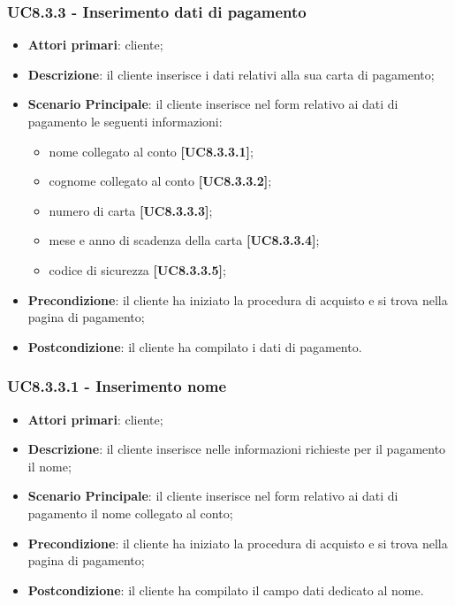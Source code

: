 \subsubsection{UC8.3.3 - Inserimento dati di pagamento}
\begin{itemize}
\item \textbf{Attori primari}: cliente;
\item \textbf{Descrizione}: il cliente inserisce i dati relativi alla sua carta di pagamento;
\item \textbf{Scenario Principale}: il cliente inserisce nel form relativo ai dati di pagamento le seguenti informazioni:
\begin{itemize}
	\item nome collegato al conto \textbf{[UC8.3.3.1]};
	\item cognome collegato al conto \textbf{[UC8.3.3.2]};
	\item numero di carta \textbf{[UC8.3.3.3]};
	\item mese e anno di scadenza della carta \textbf{[UC8.3.3.4]};
	\item codice di sicurezza \textbf{[UC8.3.3.5]};
\end{itemize}
\item \textbf{Precondizione}: il cliente ha iniziato la procedura di acquisto e si trova nella pagina di pagamento;
\item \textbf{Postcondizione}: il cliente ha compilato i dati di pagamento.
\end{itemize}

\subsubsection{UC8.3.3.1 - Inserimento nome}
\begin{itemize}
\item \textbf{Attori primari}: cliente;
\item \textbf{Descrizione}: il cliente inserisce nelle informazioni richieste per il pagamento il nome;
\item \textbf{Scenario Principale}: il cliente inserisce nel form relativo ai dati di pagamento il nome collegato al conto;
\item \textbf{Precondizione}: il cliente ha iniziato la procedura di acquisto e si trova nella pagina di pagamento;
\item \textbf{Postcondizione}: il cliente ha compilato il campo dati dedicato al nome.
\end{itemize}

